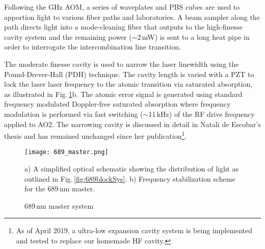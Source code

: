 Following the GHz AOM, a series of waveplates and PBS cubes are used to apportion light to various fiber paths and laboratories.
A beam sampler along the path directs light into a mode-cleaning fiber that outputs to the high-finesse cavity system and the remaining power ($\sim$2\,mW) is sent to a long heat pipe in order to interrogate the intercombination line transition.

The moderate finesse cavity is used to narrow the laser linewidth using the Pound-Drever-Hall (PDH) technique.
The cavity length is varied with a PZT to lock the laser laser frequency to the atomic transition via saturated absorption, as illustrated in Fig.\,\ref{fig:689master}b.
The atomic error signal is generated using standard frequency modulated Doppler-free saturated absorption where frequency modulation is performed via fast switching ($\sim$11\,kHz) of the RF drive frequency applied to AO2.
The narrowing cavity is discussed in detail in Natali de Escobar's thesis and has remained unchanged since her publication\footnote{As of April 2019, a ultra-low expansion cavity system is being implemented and tested to replace our homemade HF cavity.}.
%
	\begin{figure} 
		\centerline{
		\texttt{[image: 689\_master.png]}}
		\caption{689\,nm master system}{a) A simplified optical schematic showing the distribution of light as outlined in Fig.\,\ref{fig:689blockSys}. b) Frequency stabilization scheme for the 689\,nm master.}
		\label{fig:689master}
	\end{figure}





